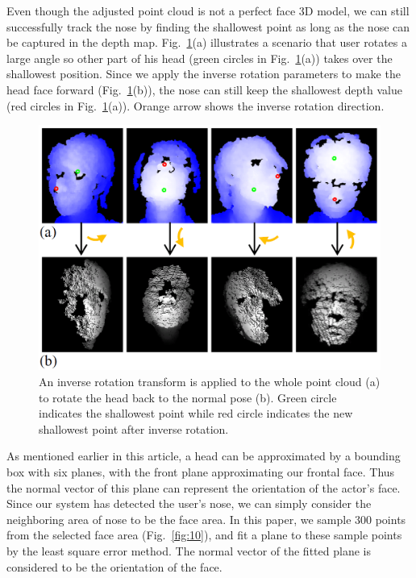 Even though the adjusted point cloud is not a perfect face 3D model, we can still successfully track the nose by finding the shallowest point as long as the nose can be captured in the depth map. Fig.~\ref{fig:9}(a) illustrates a scenario that user rotates a large angle so other part of his head (green circles in Fig.~\ref{fig:9}(a)) takes over the shallowest position. Since we apply the inverse rotation parameters to make the head face forward (Fig.~\ref{fig:9}(b)), the nose can still keep the shallowest depth value (red circles in Fig.~\ref{fig:9}(a)). Orange arrow shows the inverse rotation direction.

\begin{figure}
\includegraphics[width=1.0\linewidth]{./fig9.png}
\caption{An inverse rotation transform is applied to the whole point cloud (a) to rotate the head back to the normal pose (b). Green circle indicates the shallowest point while red circle indicates the new shallowest point after inverse rotation.}
\label{fig:9}       %
\end{figure}

As mentioned earlier in this article, a head can be approximated by a bounding box with six planes, with the front plane approximating our frontal face. Thus the normal vector of this plane can represent the orientation of the actor’s face. Since our system has detected the user’s nose, we can simply consider the neighboring area of nose to be the face area. In this paper, we sample 300 points from the selected face area (Fig.~\ref{fig:10}), and fit a plane to these sample points by the least square error method. The normal vector of the fitted plane is considered to be the orientation of the face.


